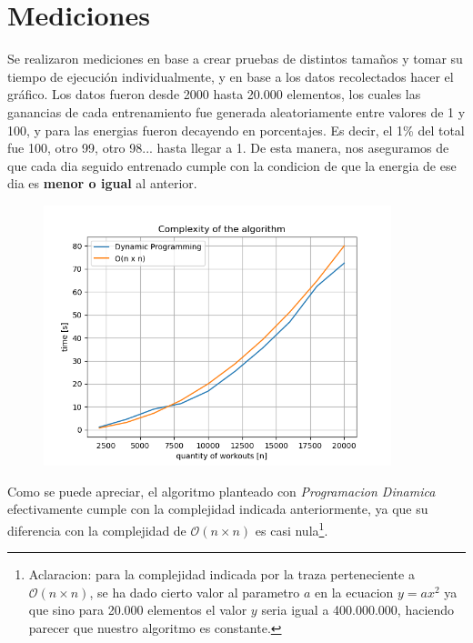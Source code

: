 \section{Mediciones}

Se realizaron mediciones en base a crear pruebas de distintos tamaños y tomar su tiempo de ejecución individualmente, y en base a los datos recolectados hacer el gráfico. Los datos fueron desde 2000 hasta 20.000 elementos, los cuales las ganancias de cada entrenamiento fue generada aleatoriamente entre valores de 1 y 100, y para las energias fueron decayendo en porcentajes. Es decir, el 1\% del total fue 100, otro 99, otro 98... hasta llegar a 1. De esta manera, nos aseguramos de que cada dia seguido entrenado cumple con la condicion de que la energia de ese dia es \textbf{menor o igual} al anterior.

\begin{figure}[H]
	\centering
	\includegraphics[width=0.9\textwidth]{img/graphic.png}
\end{figure}

Como se puede apreciar, el algoritmo planteado con \textit{Programacion Dinamica} efectivamente cumple con la complejidad indicada anteriormente, ya que su diferencia con la complejidad de $\mathcal{O}(n \times n)$ es casi nula\footnote{Aclaracion: para la complejidad indicada por la traza perteneciente a $\mathcal{O}(n \times n)$, se ha dado cierto valor al parametro $a$ en la ecuacion $y=ax^2$ ya que sino para 20.000 elementos el valor $y$ seria igual a 400.000.000, haciendo parecer que nuestro algoritmo es constante.}.
